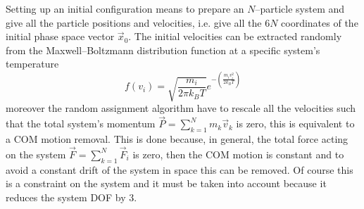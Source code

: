 Setting up an initial configuration means to prepare an $N$--particle system and give all the particle positions and velocities, i.e. give all the $6N$ coordinates of the initial phase space vector $\vec x_0$. The initial velocities can be extracted randomly from the Maxwell--Boltzmann distribution function at a specific system's temperature
\begin{equation*}
	f(v_i) = \sqrt{\frac{m_i}{2\pi k_B T}}e^{-\left ( \frac{m_iv_i^2}{2k_B T}\right )}
\end{equation*}
moreover the random assignment algorithm have to rescale all the velocities such that the total system's momentum $\vec P = \sum_{k=1}^N m_k\vec v_k$ is zero, this is equivalent to a \ac{COM} motion removal. This is done because, in general, the total force acting on the system $\vec F = \sum_{k=1}^N \vec F_i$ is zero, then the \ac{COM} motion is constant and to avoid a constant drift of the system in space this can be removed. Of course this is a constraint on the system and it must be taken into account because it reduces the system \ac{DOF} by $3$.

